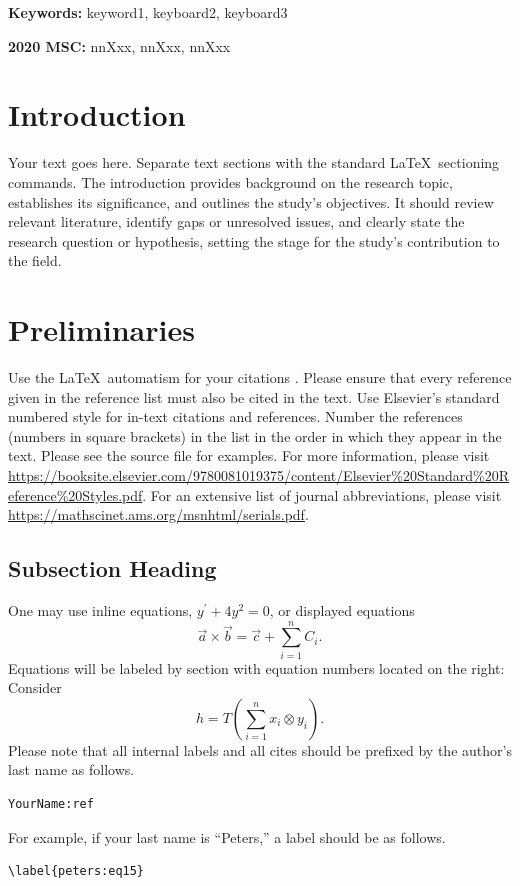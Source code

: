 \documentclass[12pt, a4paper, twoside]{article}
\newcommand{\mykeywords}[1]{%
    \noindent \textbf{Keywords:} #1 \par
}
\newcommand{\myMSC}[1]{
    \noindent \textbf{2020 MSC:} #1 \par
}
\theoremstyle{plain}
\theoremstyle{definition}
\theoremstyle{remark}
\numberwithin{equation}{section}
\begin{document}

\mykeywords{keyword1, keyboard2, keyboard3} %
\smallskip
\myMSC{nnXxx, nnXxx, nnXxx} %


\section{Introduction}\label{yourname:intro}
Your text goes here. Separate text sections with the standard \LaTeX\ sectioning commands. The introduction provides background on the research topic, establishes its significance, and outlines the study's objectives. It should review relevant literature, identify gaps or unresolved issues, and clearly state the research question or hypothesis, setting the stage for the study's contribution to the field.

\section{Preliminaries}\label{yourname:prelim}
Use the \LaTeX\ automatism for your citations \cite{yourname:book, yourname:bookchapter, yourname:article}. Please ensure that every reference given in the reference list must also be cited in the text. Use Elsevier's standard numbered style for in-text citations and references. 
Number the references (numbers in square brackets) in the list in the order in which they appear in the text. Please see the source file for examples. For more information, please visit \url{https://booksite.elsevier.com/9780081019375/content/Elsevier\%20Standard\%20Reference\%20Styles.pdf}. For an extensive list of journal abbreviations, please visit \url{https://mathscinet.ams.org/msnhtml/serials.pdf}.

\subsection{Subsection Heading}\label{yourname:intro_I}
One may use inline equations, $y^{\prime}+4y^2=0$, or displayed equations
\[
	\vec{a}\times\vec{b} = \vec{c}+\sum_{i=1}^n C_i.
\]
Equations will be labeled by section with equation numbers located on the right: Consider
\begin{equation}\label{yourname:eq15}
	h =T \left ( \sum_{i=1}^n x_i \otimes y_i \right ).
\end{equation}
Please note that all internal labels and all cites 
should be prefixed by the author's last name as follows.
\begin{verbatim}
YourName:ref
\end{verbatim}
For example, if your last name is ``Peters,''  a label should be as follows.
\begin{verbatim}
\label{peters:eq15}
\end{verbatim}
\end{document}
